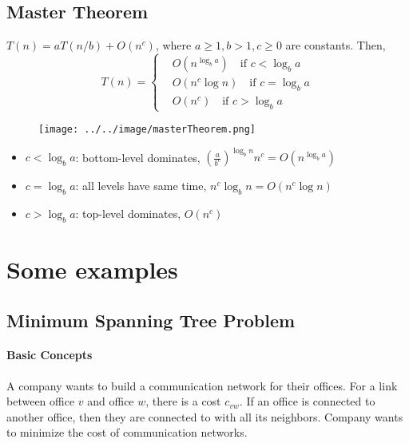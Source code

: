         \subsection{Master Theorem}
            \begin{theorem}
                $T(n) = aT(n/b) + O(n^c)$, where $a \ge 1, b > 1, c \ge 0$ are constants. Then,
                \begin{equation*}
                    T(n) = \begin{cases}
                        & O(n^{\log_b a}) \quad \text{if } c < \log_b a\\
                        & O(n^c \log n) \quad \text{if } c = \log_b a\\
                        & O(n^c) \quad \text{if } c > \log_b a
                    \end{cases}
                \end{equation*}
            \end{theorem}

            \begin{figure}[H]
                \centering
                \texttt{[image: ../../image/masterTheorem.png]}
                \label{fig:masterTheorem}
            \end{figure}

            \begin{itemize}
                \item $c < \log_b a$: bottom-level dominates, $(\frac{a}{b^c})^{\log_b n} n^c = O(n^{\log_b a})$
                \item $c = \log_b a$: all levels have same time, $n^c \log_b n = O(n^c \log n)$
                \item $c > \log_b a$: top-level dominates, $O(n^c)$
            \end{itemize}

    \section{Some examples}
        \subsection{Minimum Spanning Tree Problem}
            \paragraph{Basic Concepts}
                \begin{example}
                    A company wants to build a communication network for their offices. For a link between office $v$ and office $w$, there is a cost $c_{vw}$. If an office is connected to another office, then they are connected to with all its neighbors. Company wants to minimize the cost of communication networks.
                \end{example}

